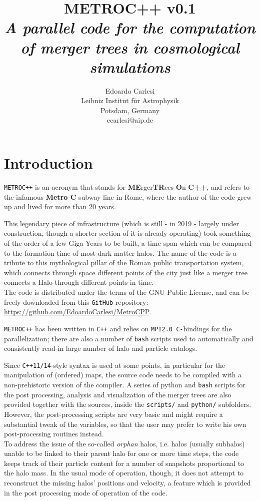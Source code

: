 \documentclass{article}
\title{\textbf{METROC++ v0.1} \\
\emph{A parallel code for the computation of merger trees in 
cosmological simulations}}
\author{Edoardo Carlesi\\ Leibniz Institut f\"ur Astrophysik\\ Potsdam, Germany\\ ecarlesi@aip.de}
\begin{document}
\maketitle
\tableofcontents
\newpage

\section{Introduction}
\texttt{METROC++} is an acronym that stands for \textbf{ME}rger\textbf{TR}ees \textbf{O}n \textbf{C++}, and refers to the 
infamous \textbf{Metro C} subway line in Rome, where the author of the code grew up and lived for more than 20 years.

This legendary piece of infrastructure (which is still - in 2019 - largely under construction, though a shorter section of 
it is already operating) took something of the order of a few Giga-Years to be built, a time span which can be compared to the
formation time of most dark matter halos. The name of the code is a tribute to this mythological pillar of the Roman public
transportation system, which connects through space different points of the city just like a merger tree connects a Halo 
through different points in time.\\

The code is distributed under the terms of the GNU Public License, and can be freely downloaded from 
this \texttt{GitHub} repository: 
\href{https://github.com/EdoardoCarlesi/MetroCPP}{https://github.com/EdoardoCarlesi/MetroCPP}.

\texttt{METROC++} has been written in \texttt{C++} and relies on \texttt{MPI2.0 C-}bindings for the parallelization; there are
also a number of \texttt{bash} scripts used to automatically and consistently read-in large number of halo and particle catalogs.

Since \texttt{C++11/14}-style syntax is used at some points, in particular for the manipulation
of (ordered) maps, the source code needs to be compiled with a non-prehistoric version of the compiler.
A series of python and \texttt{bash} scripts for the post processing, analysis and visualization of the merger trees are also provided 
together with the sources, inside the \texttt{scripts/} and \texttt{python/} subfolders. 
However, the post-processing scripts are very basic and might require a substantial tweak of the variables, so that the user
may prefer to write his own post-processing routines instead.\\

To address the issue of the so-called \emph{orphan} halos, i.e. halos (usually subhalos) unable to be linked to their parent 
halo for one or more time steps, the code keeps track of their particle content for a number of snapshots proportional to the
halo mass. In the usual mode of operation, though, it does not attempt to reconstruct the missing halos' positions and
velocity, a feature which is provided in the post processing mode of operation of the code.\\
\end{document}
